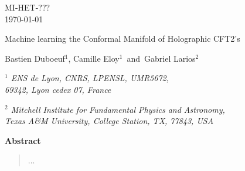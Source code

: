 \documentclass[11pt]{article}
\begin{document}
\begin{titlepage}



\begin{flushright}

MI-HET-??? \\
\today
\end{flushright}


\vspace{25pt}

   
   \begin{center}
   \baselineskip=16pt

{\Large Machine learning the Conformal Manifold of Holographic CFT2’s}


   		
\vspace{25pt}
		

{\large  Bastien Duboeuf$^{1}$, Camille Eloy$^{1}$ \,and\, Gabriel Larios$^{2}$}
		
\vspace{25pt}
		
		
	\begin{small}

	{\it $^{1}$ ENS de Lyon, CNRS, LPENSL, UMR5672,\\ 69342, Lyon cedex 07, France}  \\


	\vspace{10pt}
	
	{\it $^{2}$ Mitchell Institute for Fundamental Physics and Astronomy, \\
	Texas A\&M University, College Station, TX, 77843, USA}     \\
		
	\end{small}
		

\vskip 50pt

\end{center}


\begin{center}
\textbf{Abstract}
\end{center}


\begin{quote}

...

\end{quote}

\vfill

\end{titlepage}


\tableofcontents
\end{document}
